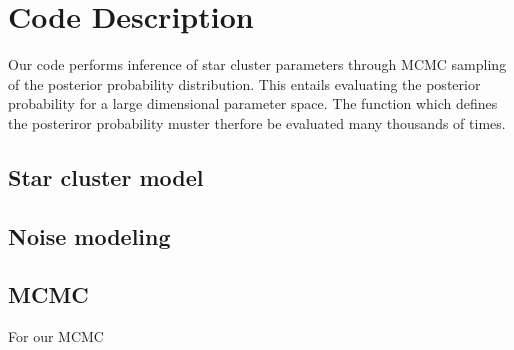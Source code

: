 \section{Code Description}

Our code performs inference of star cluster parameters through MCMC sampling of the posterior probability distribution.  This entails evaluating the posterior probability for a large dimensional parameter space.  The function which defines the posteriror probability muster therfore be evaluated many thousands of times.

\subsection{Star cluster model}

\subsection{Noise modeling}

\subsection{MCMC}
For our MCMC